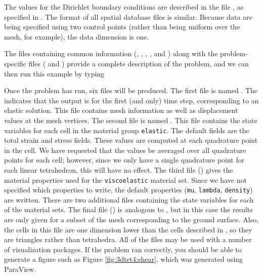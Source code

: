 The values for the Dirichlet boundary conditions are described in
the file , as specified in .
The format of all spatial database files is similar. Because data
are being specified using two control points (rather than being uniform
over the mesh, for example), the data dimension is one.

The files containing common information
(,
, ,
, and
) along with the
problem-specific files ( and
) provide a complete description
of the problem, and we can then run this example by typing
Once the problem has run, six files will be produced. The first file
is named . The 
indicates that the output is for the first (and only) time step,
corresponding to an elastic solution. This file contains mesh
information as well as displacement values at the mesh vertices. The
second file is named
. This file contains
the state variables for each cell in the material group
\texttt{elastic}.  The default fields are the total strain and stress
fields. These values are computed at each quadrature point in the
cell. We have requested that the values be averaged over all
quadrature points for each cell; however, since we only have a single
quadrature point for each linear tetrahedron, this will have no
effect. The third file
() gives the
material properties used for the \texttt{viscoelastic} material
set. Since we have not specified which properties to write, the
default properties (\texttt{mu}, \texttt{lambda}, \texttt{density})
are written.  There are two additional files containing the state
variables for each of the material sets. The final file
() is analogous to
, but in this case the results are only
given for a subset of the mesh corresponding to the ground
surface. Also, the cells in this file are one dimension lower than the
cells described in , so they are
triangles rather than tetrahedra. All of the  files may
be used with a number of visualization packages. If the problem ran
correctly, you should be able to generate a figure such as Figure
\vref{fig:3dtet4:shear}, which was generated using ParaView.

